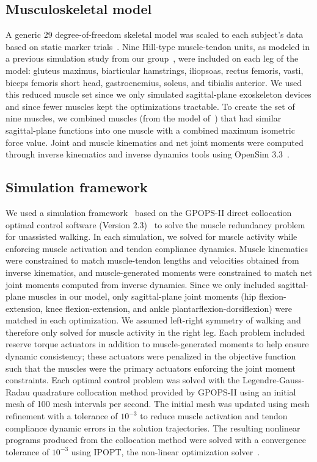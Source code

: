 \documentclass[10pt,letterpaper]{article}
\begin{document}
\subsection*{Musculoskeletal model}
A generic 29 degree-of-freedom skeletal model was scaled to each subject’s data based on static marker trials~\cite{Rajagopal:2016}. Nine Hill-type muscle-tendon units, as modeled in a previous simulation study from our group~\cite{Ong:2019}, were included on each leg of the model: gluteus maximus, biarticular hamstrings, iliopsoas, rectus femoris, vasti, biceps femoris short head, gastrocnemius, soleus, and tibialis anterior. We used this reduced muscle set since we only simulated sagittal-plane exoskeleton devices and since fewer muscles kept the optimizations tractable. To create the set of nine muscles, we combined muscles (from the model of~\cite{Rajagopal:2016}) that had similar sagittal-plane functions into one muscle with a combined maximum isometric force value. Joint and muscle kinematics and net joint moments were computed through inverse kinematics and inverse dynamics tools using OpenSim 3.3~\cite{Delp:2007}.

\subsection*{Simulation framework}
We used a simulation framework~\cite{DeGroote:2016} based on the GPOPS-II direct collocation optimal control software (Version 2.3)~\cite{Patterson:2014} to solve the muscle redundancy problem for unassisted walking. In each simulation, we solved for muscle activity while enforcing muscle activation and tendon compliance dynamics. Muscle kinematics were constrained to match muscle-tendon lengths and velocities obtained from inverse kinematics, and muscle-generated moments were constrained to match net joint moments computed from inverse dynamics. Since we only included sagittal-plane muscles in our model, only sagittal-plane joint moments (hip flexion-extension, knee flexion-extension, and ankle plantarflexion-dorsiflexion) were matched in each optimization. We assumed left-right symmetry of walking and therefore only solved for muscle activity in the right leg. Each problem included reserve torque actuators in addition to muscle-generated moments to help ensure dynamic consistency; these actuators were penalized in the objective function such that the muscles were the primary actuators enforcing the joint moment constraints. Each optimal control problem was solved with the Legendre-Gauss-Radau quadrature collocation method provided by GPOPS-II using an initial mesh of 100 mesh intervals per second. The initial mesh was updated using mesh refinement with a tolerance of $10^{-3}$ to reduce muscle activation and tendon compliance dynamic errors in the solution trajectories. The resulting nonlinear programs produced from the collocation method were solved with a convergence tolerance of $10^{-3}$ using IPOPT, the non-linear optimization solver~\cite{Wachter:2006}.
\end{document}
